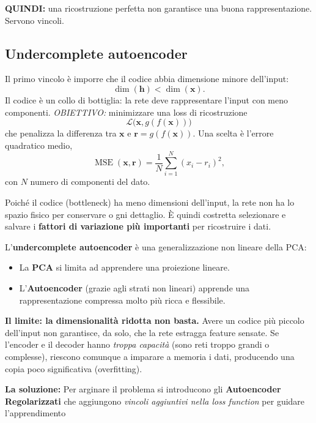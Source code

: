 \documentclass[11pt,a4paper]{article}
\begin{document}
\textbf{QUINDI:} una ricostruzione perfetta non garantisce una buona
rappresentazione. Servono vincoli.

\subsection{Undercomplete autoencoder}

Il primo vincolo è imporre che il codice abbia dimensione minore dell'input:
\[
\dim(\mathbf{h})<\dim(\mathbf{x}).
\]
Il codice è un collo di bottiglia: la rete deve rappresentare l'input con meno
componenti. \textit{OBIETTIVO:} minimizzare una loss di ricostruzione
\[
\boxed{\mathcal{L}\big(\mathbf{x},g(f(\mathbf{x}))\big)}
\]
che penalizza la differenza tra $\mathbf{x}$ e $\mathbf{r}=g(f(\mathbf{x}))$.
Una scelta è l'errore quadratico medio,
\[
\operatorname{MSE}(\mathbf{x},\mathbf{r})=\frac{1}{N}\sum_{i=1}^{N}(x_i-r_i)^2,
\]
con $N$ numero di componenti del dato.

Poiché il codice (bottleneck) ha meno dimensioni dell'input, la rete non ha lo spazio fisico per conservare o
gni dettaglio. È quindi costretta selezionare e salvare i 
\textbf{fattori di variazione più importanti} per ricostruire i dati.

L'\textbf{undercomplete autoencoder} è una generalizzazione non lineare della PCA:
\begin{itemize}
    \item La \textbf{PCA} si limita ad apprendere una proiezione lineare.
    \item L'\textbf{Autoencoder} (grazie agli strati non lineari) apprende una rappresentazione compressa 
    molto più ricca e flessibile.
\end{itemize}

\vspace{0.2cm}
\textbf{Il limite: la dimensionalità ridotta non basta.} 
Avere un codice più piccolo dell'input non garantisce, da solo, che la rete estragga feature sensate. 
Se l'encoder e il decoder hanno \emph{troppa capacità} (sono reti troppo grandi o complesse), 
riescono comunque a imparare a memoria i dati, producendo una copia poco significativa (overfitting).

\textbf{La soluzione:} Per arginare il problema si introducono gli \textbf{Autoencoder Regolarizzati} che 
aggiungono \emph{vincoli aggiuntivi nella loss function} per guidare l'apprendimento
\end{document}
